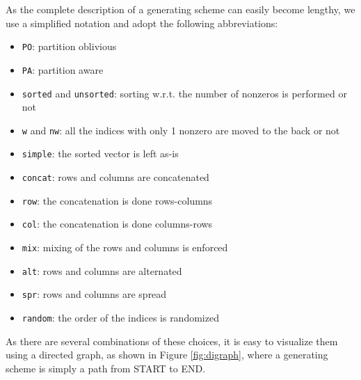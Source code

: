 As the complete description of a generating scheme can easily become lengthy, we use a simplified notation and adopt the following abbreviations:

\begin{itemize}
	\item \verb|PO|: partition oblivious
	\item \verb|PA|: partition aware
	\item \verb|sorted| and \verb|unsorted|: sorting w.r.t. the number of nonzeros is performed or not
	\item \verb|w| and \verb|nw|: all the indices with only 1 nonzero are moved to the back or not
	\item \verb|simple|: the sorted vector is left as-is
	\item \verb|concat|: rows and columns are concatenated
	\item \verb|row|: the concatenation is done rows-columns
	\item \verb|col|: the concatenation is done columns-rows
	\item \verb|mix|: mixing of the rows and columns is enforced
	\item \verb|alt|: rows and columns are alternated
	\item \verb|spr|: rows and columns are spread
	\item \verb|random|: the order of the indices is randomized
\end{itemize}


As there are several combinations of these choices, it is easy to visualize them using a directed graph, as shown in Figure \ref{fig:digraph}, where a generating scheme is simply a path from START to END. 

